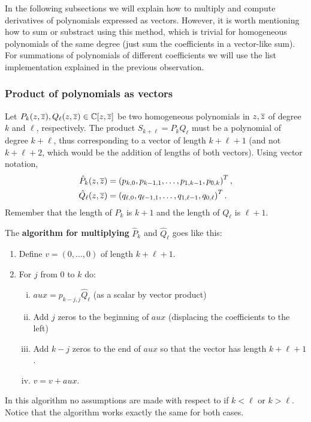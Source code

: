 In the following subsections we will explain how to multiply and compute derivatives of polynomials expressed as vectors. However, it is worth mentioning how to sum or substract using this method, which is trivial for homogeneous polynomials of the same degree (just sum the coefficients in a vector-like sum). For summations of polynomials of different coefficients we will use the list implementation explained in the previous observation.




\subsubsection{Product of polynomials as vectors}

Let $P_k(z,\overline{z}),Q_{\ell}(z,\overline{z})\in\mathbb{C}[z,\overline{z}]$ be two homogeneous polynomials in $z,\overline{z}$ of degree $k$ and $\ell$, respectively. The product $S_{k+\ell}=P_kQ_{\ell}$ must be a polynomial of degree $k+\ell$, thus corresponding to a vector of length $k+\ell+1$ (and not $k+\ell+2$, which would be the addition of lengths of both vectors). Using vector notation,
\begin{align*}
\hat P_k(z,\overline{z})&=\left(p_{k,0},p_{k-1,1},\dots,p_{1,k-1},p_{0,k}\right)^T,\\
\hat Q_\ell(z,\overline{z}) &= \left(q_{\ell,0},q_{\ell-1,1},\dots,q_{1,\ell-1},q_{0,\ell}\right)^T.
\end{align*}
Remember that the length of $P_k$ is $k+1$ and the length of $Q_{\ell}$ is $\ell+1$. 

The \textbf{algorithm for multiplying} $\hat P_k$ and $\hat Q_{\ell}$ goes like this:
\begin{enumerate}
\item
Define $v=(0,\dots,0)$ of length $k+\ell+1$.
\item
For $j$ from 0 to $k$ do:
\begin{enumerate}[(i)]
\item
$aux = p_{k-j,j} \hat Q_{\ell}$ (as a scalar by vector product)
\item
Add $j$ zeros to the beginning of $aux$ (displacing the coefficients to the left)
\item
Add $k-j$ zeros to the end of $aux$ so that the vector has length $k+\ell+1$.
\item
$v = v+aux$.
\end{enumerate}
\end{enumerate}

\begin{observacio}
In this algorithm no assumptions are made with respect to if $k<\ell$ or $k>\ell$. Notice that the algorithm works exactly the same for both cases.
\end{observacio}


